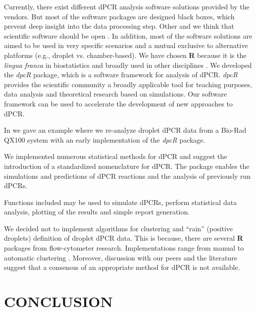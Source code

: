 \documentclass[a4,center,fleqn]{NAR}
\begin{document}
Currently, there exist different dPCR analysis software solutions provided by 
the vendors. But most of the software packages are designed black boxes, which 
prevent deep insight into the data processing step. Other and we think that 
scientific software should be open \cite{morin_shining_2012, ince_case_2012, 
rodiger_r_2015}. In addition, most of the software solutions are aimed to be 
used in very specific scenarios and a mutual exclusive to alternative platforms 
(e.g., droplet vs. chamber-based). We have chosen \textbf{R} because it is the 
\textit{lingua franca} in biostatistics and broadly used in other disciplines 
\cite{rodiger_r_2015}. We developed the \textit{dpcR} package, which is a 
software framework for analysis of dPCR. \textit{dpcR} provides the scientific 
community a broadly applicable tool for teaching purposes, data analysis and 
theoretical research based on simulations. Our software framework can be used to 
accelerate the development of new approaches to dPCR.

In \cite{rodiger_r_2015} we gave an example where we re-analyze droplet dPCR 
data from a Bio-Rad QX100 system with an early implementation of the 
\textit{dpcR} package.

We implemented numerous statistical methods for dPCR and suggest the 
introduction of a standardized nomenclature for dPCR. The package enables the 
simulations and predictions of dPCR reactions and the analysis of previously run dPCRs.

Functions included may be used to simulate dPCRs, perform statistical data 
analysis, plotting of the results and simple report generation. 

We decided not to implement algorithms for clustering and ``rain'' (positive droplets) definition of 
droplet dPCR data. This is because, there are several \textbf{R} packages from 
flow-cytometer research. Implementations range from manual to automatic 
clustering \cite{le_meur_computational_2013, Malek15022015, trypsteen_ddpcrquant_2015}. Moreover, 
discussion with our peers and the literature suggest that a consensus of an 
appropriate method for dPCR is not available.

\section{CONCLUSION}
\end{document}
